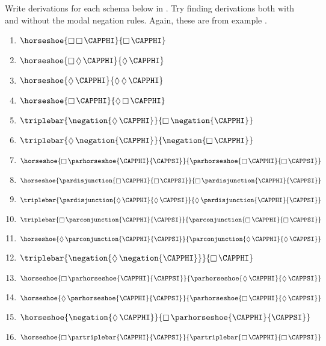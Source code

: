 Write derivations for each schema below in \SF{}. 
Try finding derivations both with and without the modal negation rules. 
Again, these are from example .
\begin{multicols}{2}
	\begin{enumerate}
		\item $\horseshoe{\BOX\BOX\CAPPHI}{\BOX\CAPPHI}$
		\item $\horseshoe{\BOX\DIAMOND\CAPPHI}{\DIAMOND\CAPPHI}$
		\item $\horseshoe{\DIAMOND\CAPPHI}{\DIAMOND\DIAMOND\CAPPHI}$
		\item $\horseshoe{\BOX\CAPPHI}{\DIAMOND\BOX\CAPPHI}$
		\item $\triplebar{\negation{\DIAMOND\CAPPHI}}{\BOX\negation{\CAPPHI}}$
		\item $\triplebar{\DIAMOND\negation{\CAPPHI}}{\negation{\BOX\CAPPHI}}$
		\item $\horseshoe{\BOX\parhorseshoe{\CAPPHI}{\CAPPSI}}{\parhorseshoe{\BOX\CAPPHI}{\BOX\CAPPSI}}$
		\item $\horseshoe{\pardisjunction{\BOX\CAPPHI}{\BOX\CAPPSI}}{\BOX\pardisjunction{\CAPPHI}{\CAPPSI}}$
		\item $\triplebar{\pardisjunction{\DIAMOND\CAPPHI}{\DIAMOND\CAPPSI}}{\DIAMOND\pardisjunction{\CAPPHI}{\CAPPSI}}$
		\item $\triplebar{\BOX\parconjunction{\CAPPHI}{\CAPPSI}}{\parconjunction{\BOX\CAPPHI}{\BOX\CAPPSI}}$
		\item $\horseshoe{\DIAMOND\parconjunction{\CAPPHI}{\CAPPSI}}{\parconjunction{\DIAMOND\CAPPHI}{\DIAMOND\CAPPSI}}$
		\item $\triplebar{\negation{\DIAMOND\negation{\CAPPHI}}}{\BOX\CAPPHI}$
		\item $\horseshoe{\BOX\parhorseshoe{\CAPPHI}{\CAPPSI}}{\parhorseshoe{\DIAMOND\CAPPHI}{\DIAMOND\CAPPSI}}$
		\item $\horseshoe{\DIAMOND\parhorseshoe{\CAPPHI}{\CAPPSI}}{\parhorseshoe{\BOX\CAPPHI}{\DIAMOND\CAPPSI}}$
		\item $\horseshoe{\negation{\DIAMOND\CAPPHI}}{\BOX\parhorseshoe{\CAPPHI}{\CAPPSI}}$
		\item $\horseshoe{\BOX\partriplebar{\CAPPHI}{\CAPPSI}}{\partriplebar{\BOX\CAPPHI}{\BOX\CAPPSI}}$
	\end{enumerate}
\end{multicols}


